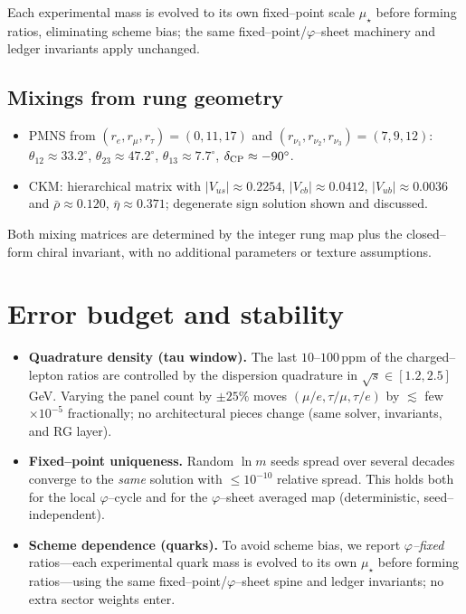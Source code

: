 \documentclass[11pt]{article}
\begin{document}
Each experimental mass is evolved to its own fixed--point scale $\mu_\star$ before forming ratios, eliminating scheme bias; the same fixed–point/$\varphi$–sheet machinery and ledger invariants apply unchanged.

\subsection{Mixings from rung geometry}
\begin{itemize}
  \item PMNS from $(r_e,r_\mu,r_\tau)=(0,11,17)$ and $(r_{\nu_1},r_{\nu_2},r_{\nu_3})=(7,9,12)$:
  $\theta_{12}\approx33.2^\circ$, $\theta_{23}\approx47.2^\circ$, $\theta_{13}\approx7.7^\circ$, $\delta_{\rm CP}\approx-90^\circ$.
  \item CKM: hierarchical matrix with $|V_{us}|\approx0.2254$, $|V_{cb}|\approx0.0412$, $|V_{ub}|\approx0.0036$ and $\bar\rho\approx0.120$, $\bar\eta\approx0.371$; degenerate sign solution shown and discussed.
\end{itemize}
Both mixing matrices are determined by the integer rung map plus the closed--form chiral invariant, with no additional parameters or texture assumptions.

\section{Error budget and stability}
\begin{itemize}
  \item \textbf{Quadrature density (tau window).} The last $10$--$100$\,ppm of the charged--lepton ratios are controlled by the dispersion quadrature in $\sqrt{s}\!\in[1.2,2.5]$\,GeV. Varying the panel count by $\pm25\%$ moves $(\mu/e,\tau/\mu,\tau/e)$ by $\lesssim$ few$\times 10^{-5}$ fractionally; no architectural pieces change (same solver, invariants, and RG layer).
  \item \textbf{Fixed–point uniqueness.} Random $\ln m$ seeds spread over several decades converge to the \emph{same} solution with $\le 10^{-10}$ relative spread. This holds both for the local $\varphi$–cycle and for the $\varphi$–sheet averaged map (deterministic, seed–independent).
  \item \textbf{Scheme dependence (quarks).} To avoid scheme bias, we report \emph{$\varphi$–fixed} ratios—each experimental quark mass is evolved to its own $\mu_\star$ before forming ratios—using the same fixed–point/$\varphi$–sheet spine and ledger invariants; no extra sector weights enter.
\end{itemize}
\end{document}
